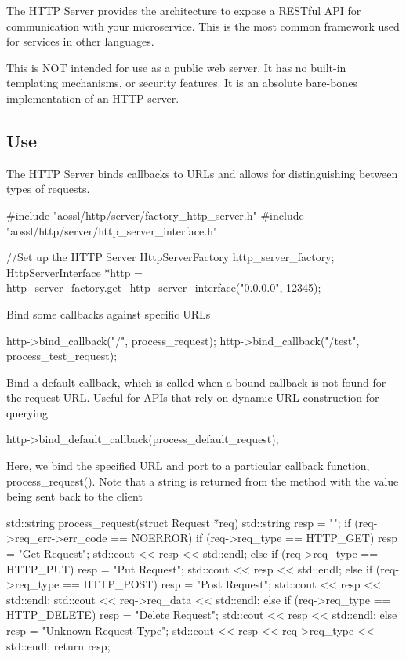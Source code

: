 The H\+T\+TP Server provides the architecture to expose a R\+E\+S\+Tful A\+PI for communication with your microservice. This is the most common framework used for services in other languages.

This is N\+OT intended for use as a public web server. It has no built-\/in templating mechanisms, or security features. It is an absolute bare-\/bones implementation of an H\+T\+TP server.

\subsection*{Use}

The H\+T\+TP Server binds callbacks to U\+RL\textquotesingle{}s and allows for distinguishing between types of requests. \begin{DoxyVerb}#include "aossl/http/server/factory_http_server.h"
#include "aossl/http/server/http_server_interface.h"

//Set up the HTTP Server
HttpServerFactory http_server_factory;
HttpServerInterface *http = http_server_factory.get_http_server_interface("0.0.0.0", 12345);
\end{DoxyVerb}


Bind some callbacks against specific U\+R\+Ls \begin{DoxyVerb}http->bind_callback("/", process_request);
http->bind_callback("/test", process_test_request);
\end{DoxyVerb}


Bind a default callback, which is called when a bound callback is not found for the request U\+RL. Useful for A\+PI\textquotesingle{}s that rely on dynamic U\+RL construction for querying \begin{DoxyVerb}http->bind_default_callback(process_default_request);
\end{DoxyVerb}


Here, we bind the specified U\+RL and port to a particular callback function, process\+\_\+request(). Note that a string is returned from the method with the value being sent back to the client \begin{DoxyVerb}std::string process_request(struct Request *req)
{
  std::string resp = "";
  if (req->req_err->err_code == NOERROR)
  {
    if (req->req_type == HTTP_GET)
    {
      resp = "Get Request";
      std::cout << resp << std::endl;
    }
    else if (req->req_type == HTTP_PUT)
    {
      resp = "Put Request";
      std::cout << resp << std::endl;
    }
    else if (req->req_type == HTTP_POST)
    {
      resp = "Post Request";
      std::cout << resp << std::endl;
      std::cout << req->req_data << std::endl;
    }
    else if (req->req_type == HTTP_DELETE)
    {
      resp = "Delete Request";
      std::cout << resp << std::endl;
    }
    else
    {
      resp = "Unknown Request Type";
      std::cout << resp << req->req_type << std::endl;
    }
  }
  return resp;
}
\end{DoxyVerb}



